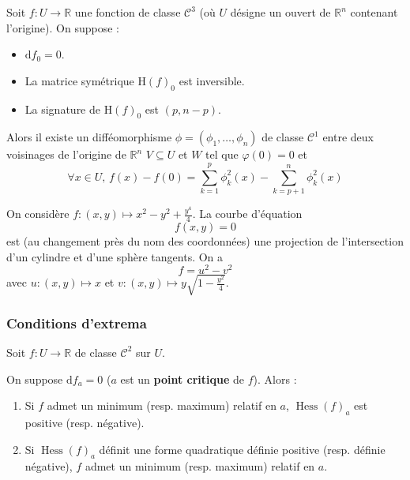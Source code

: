 
  \begin{lemma}
    Soit $f : U \rightarrow \mathbb{R}$ une fonction de classe $\mathcal{C}^3$ (où $U$ désigne un ouvert de $\mathbb{R}^n$ contenant l'origine). On suppose :
    \begin{itemize}
      \item $\mathrm{d} f_0 = 0$.
      \item La matrice symétrique $\mathrm{H} (f)_0$ est inversible.
      \item La signature de $\mathrm{H}(f)_0$ est $(p, n-p)$.
    \end{itemize}
    Alors il existe un difféomorphisme $\phi = (\phi_1, \dots, \phi_n)$ de classe $\mathcal{C}^1$ entre deux voisinages de l'origine de $\mathbb{R}^n$ $V \subseteq U$ et $W$ tel que $\varphi(0) = 0$ et
    \[ \forall x \in U, \, f(x) - f(0) = \sum_{k=1}^p \phi_k^2(x) - \sum_{k=p+1}^n \phi_k^2(x) \]
  \end{lemma}


  \begin{example}
    On considère $f : (x,y) \mapsto x^2-y^2+\frac{y^4}{4}$. La courbe d'équation
    \[ f(x,y) = 0 \]
    est (au changement près du nom des coordonnées) une projection de l'intersection d'un cylindre et d'une sphère tangents. On a
    \[ f = u^2 - v^2 \]
    avec $u : (x,y) \mapsto x$ et $v : (x,y) \mapsto y \sqrt{1-\frac{y^2}{4}}$.
  \end{example}

  \subsubsection{Conditions d'extrema}

  Soit $f : U \rightarrow \mathbb{R}$ de classe $\mathcal{C}^2$ sur $U$.


  \begin{theorem}
    On suppose $\mathrm{d}f_a = 0$ ($a$ est un \textbf{point critique} de $f$). Alors :
    \begin{enumerate}[label={\bfseries(\roman*)}]
      \item Si $f$ admet un minimum (resp. maximum) relatif en $a$, $\operatorname{Hess}(f)_a$ est positive (resp. négative).
      \item Si $\operatorname{Hess}(f)_a$ définit une forme quadratique définie positive (resp. définie négative), $f$ admet un minimum (resp. maximum) relatif en $a$.
    \end{enumerate}
  \end{theorem}

